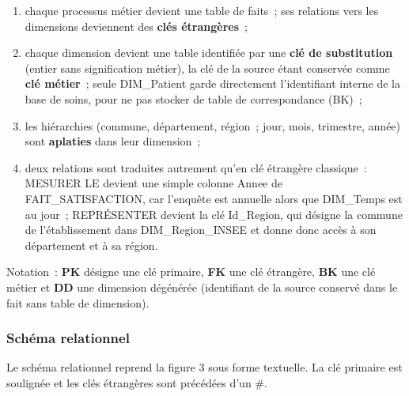 \begin{enumerate}
	\item chaque processus métier devient une table de faits~; ses relations vers les dimensions deviennent des \textbf{clés étrangères}~;
	\item chaque dimension devient une table identifiée par une \textbf{clé de substitution} (entier sans signification métier), la clé de la source étant conservée comme \textbf{clé métier}~; seule DIM\_Patient garde directement l'identifiant interne de la base de soins, pour ne pas stocker de table de correspondance (BK)~;
	\item les hiérarchies (commune, département, région~; jour, mois, trimestre, année) sont \textbf{aplaties} dans leur dimension~;
	\item deux relations sont traduites autrement qu'en clé étrangère classique~: \og MESURER LE\fg{} devient une simple colonne Annee de FAIT\_SATISFACTION, car l'enquête est annuelle alors que DIM\_Temps est au jour~; \og REPRÉSENTER\fg{} devient la clé Id\_Region, qui désigne la commune de l'établissement dans DIM\_Region\_INSEE et donne donc accès à son département et à sa région.
\end{enumerate}

\vspace{0.2cm}

\noindent Notation~: \textbf{PK} désigne une clé primaire, \textbf{FK} une clé étrangère, \textbf{BK} une clé métier et \textbf{DD} une dimension dégénérée (identifiant de la source conservé dans le fait sans table de dimension).

\subsubsection*{Schéma relationnel}

\noindent Le schéma relationnel reprend la figure 3 sous forme textuelle. La clé primaire est soulignée et les clés étrangères sont précédées d'un \#.

